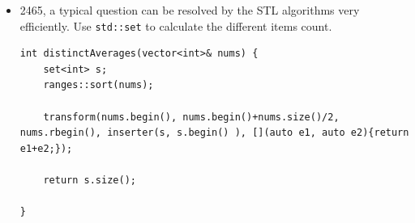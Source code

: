 \documentclass[a4paper,11pt,twoside]{book}
\begin{document}
\begin{itemize}
\begin{lstlisting}
vector<pair<int, int>> v(m.begin() , m.end());
sort(v.begin(), v.end(), [](const auto& e1, const auto & e2){
	if(e1.second != e2.second){  //The second increasing
		return e1.second<e2.second;
	}
	return e1.first>e2.first; //The first decreasing.
});

vector<int> result;
result.reserve(nums.size());
for(auto [f, s] : v){
	for(int i = 0;i<s;++i){
		result.push_back(f);
	}
}
return result;
\end{lstlisting}
	
	\item 2465, a typical question can be resolved by the STL algorithms very efficiently. Use \texttt{std::set} to calculate the different items count.
	
\begin{lstlisting}
int distinctAverages(vector<int>& nums) {
	set<int> s;
	ranges::sort(nums);
	
	transform(nums.begin(), nums.begin()+nums.size()/2, nums.rbegin(), inserter(s, s.begin() ), [](auto e1, auto e2){return e1+e2;});
	
	return s.size();
	
}	
\end{lstlisting}	
	
\end{itemize}
\end{document}
